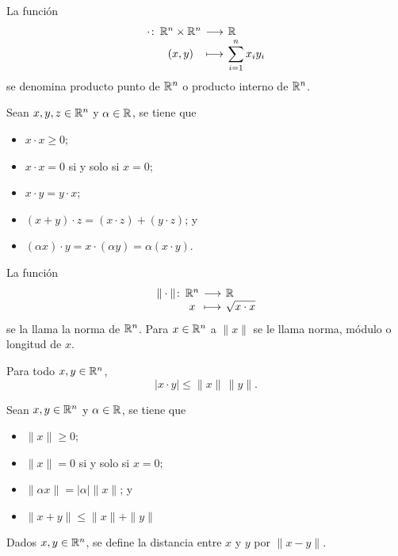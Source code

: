 \documentclass[a4,11pt]{aleph-notas}
\begin{document}
\begin{defi}
    La función 
    \[
        \funcion{\cdot}{\R^n\times \R^n}{\R}
        {(x,y)}{\sum_{i=1}^n x_iy_i}
    \]
    se denomina producto punto de $\mathbb{R}^n$ o producto interno de $\mathbb{R}^n$.
\end{defi}

\begin{teo}
    Sean $x,y,z\in \mathbb{R}^n$ y $\alpha\in\mathbb{R}$, se tiene que
    \begin{itemize}
    \item
        $x\cdot x \geq 0$;
    \item
        $x\cdot x = 0$ si y solo si $x=0$;
    \item
        $x \cdot y = y \cdot x$;
    \item 
        $(x + y)\cdot z = (x\cdot z) + (y\cdot z)$; y
    \item
        $(\alpha x)\cdot y = x\cdot(\alpha y) = \alpha(x\cdot y)$.
    \end{itemize}
\end{teo}

\begin{defi}[Norma]
    La función
    \[
        \funcion{\|\cdot\|}{\R^n}{\R}
        {x}{\sqrt{x\cdot x}}
    \]
   se la llama la norma de $\mathbb{R}^n$. Para $x\in\mathbb{R}^n$ a $\|x\|$ se le llama norma, módulo o longitud de $x$.
\end{defi}





\begin{teo}
    Para todo $x,y\in\mathbb{R}^n$,
    \[
        |x\cdot y|\leq \|x\|\,\|y\|.
    \]
\end{teo}

\begin{teo}
    Sean $x,y\in \mathbb{R}^n$ y $\alpha\in\mathbb{R}$, se tiene que
    \begin{itemize}
    \item
        $\|x\| \geq 0$;
    \item
        $\|x\| = 0$ si y solo si $x=0$;
    \item 
        $\|\alpha x\| = |\alpha|\|x\|$; y
    \item
        $\|x + y\| \leq \|x\|+\|y\|$
    \end{itemize}
\end{teo}

\begin{advertencia}
    Dados $x,y\in\mathbb{R}^n$, se define la distancia entre $x$ y $y$ por $\|x-y\|$.
\end{advertencia}
\end{document}
